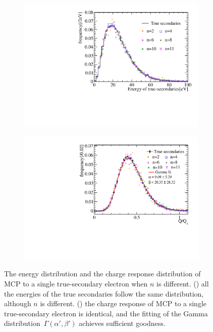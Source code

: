\begin{figure}[!htbp]
	\centering
	\begin{subfigure}{0.47\textwidth}
		\centering
		\includegraphics[width=\linewidth]{PMTRelated/GTmodel/single_pecharge.pdf}
		\caption{}
		\label{fig:single_pe}
	\end{subfigure}
	\hfill
	\begin{subfigure}{0.47\textwidth}
		\centering
		\includegraphics[width=\linewidth]{PMTRelated/GTmodel/singlepefit.pdf}
		\caption{}
		\label{fig:single_fit}
	\end{subfigure}
	\caption{The energy distribution and the charge response distribution of MCP to a single true-secondary electron when $n$ is different.
		() all the energies of the true secondaries follow the same distribution,
		although $n$ is different.
		() the charge response of MCP to a single true-secondary electron is identical,
		and the fitting of the Gamma distribution~\(\varGamma(\alpha',\beta')\)
		achieves sufficient goodness.}
	\label{fig:singlepe}
\end{figure}

